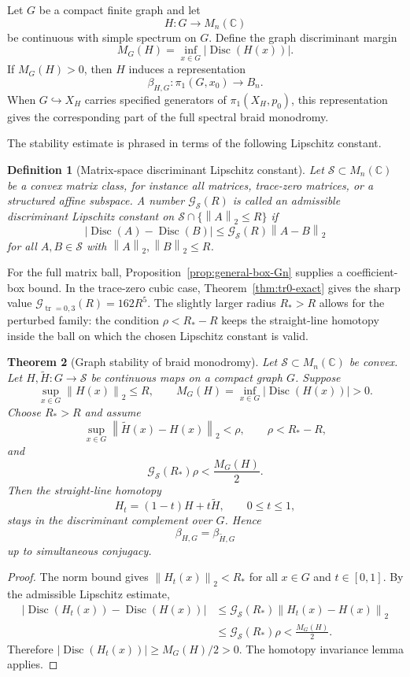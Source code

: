 \documentclass[11pt]{article}
\newtheorem{theorem}{Theorem}[section]
\newtheorem{definition}[theorem]{Definition}
\numberwithin{equation}{section}
\DeclareMathOperator{\Disc}{Disc}
\DeclareMathOperator{\tr}{tr}
\newcommand{\bbC}{\mathbb C}
\newcommand{\cG}{\mathcal G}
\newcommand{\cS}{\mathcal S}
\newcommand{\norm}[1]{\left\|#1\right\|}
\newcommand{\abs}[1]{\left|#1\right|}
\newcommand{\wt}[1]{\widetilde{#1}}
\begin{document}
Let $G$ be a compact finite graph and let
\[
  H:G\longrightarrow M_n(\bbC)
\]
be continuous with simple spectrum on $G$.  Define the graph discriminant
margin
\[
  M_G(H)=\inf_{x\in G}\abs{\Disc(H(x))}.
\]
If $M_G(H)>0$, then $H$ induces a representation
\[
  \beta_{H,G}:\pi_1(G,x_0)\longrightarrow B_n.
\]
When $G\hookrightarrow X_H$ carries specified generators of
$\pi_1(X_H,p_0)$, this representation gives the corresponding part of the
full spectral braid monodromy.

The stability estimate is phrased in terms of the following Lipschitz
constant.

\begin{definition}[Matrix-space discriminant Lipschitz constant]
Let $\cS\subset M_n(\bbC)$ be a convex matrix class, for instance all
matrices, trace-zero matrices, or a structured affine subspace.  A number
$\cG_{\cS}(R)$ is called an admissible discriminant Lipschitz constant on
$\cS\cap\{\norm{A}_2\le R\}$ if
\[
  \abs{\Disc(A)-\Disc(B)}
  \le \cG_{\cS}(R)\norm{A-B}_2
\]
for all $A,B\in\cS$ with $\norm{A}_2,\norm{B}_2\le R$.
\end{definition}

For the full matrix ball, Proposition~\ref{prop:general-box-Gn} supplies a
coefficient-box bound.  In the trace-zero cubic case,
Theorem~\ref{thm:tr0-exact} gives the sharp value
$\cG_{\tr=0,3}(R)=162R^5$.  The slightly larger radius $R_*>R$ allows for the
perturbed family: the condition $\rho<R_*-R$ keeps the straight-line homotopy
inside the ball on which the chosen Lipschitz constant is valid.

\begin{theorem}[Graph stability of braid monodromy]\label{thm:graph-stab}
Let $\cS\subset M_n(\bbC)$ be convex.  Let
$H,\wt H:G\to\cS$ be continuous maps on a compact graph $G$.  Suppose
\[
  \sup_{x\in G}\norm{H(x)}_2\le R,
  \qquad
  M_G(H)=\inf_{x\in G}\abs{\Disc(H(x))}>0.
\]
Choose $R_*>R$ and assume
\[
  \sup_{x\in G}\norm{\wt H(x)-H(x)}_2<\rho,
  \qquad
  \rho<R_*-R,
\]
and
\[
  \cG_{\cS}(R_*)\rho<\frac{M_G(H)}{2}.
\]
Then the straight-line homotopy
\[
  H_t=(1-t)H+t\wt H,
  \qquad 0\le t\le1,
\]
stays in the discriminant complement over $G$.  Hence
\[
  \beta_{H,G}=\beta_{\wt H,G}
\]
up to simultaneous conjugacy.
\end{theorem}

\begin{proof}
The norm bound gives $\norm{H_t(x)}_2<R_*$ for all $x\in G$ and
$t\in[0,1]$.  By the admissible Lipschitz estimate,
\begin{align*}
  \abs{\Disc(H_t(x))-\Disc(H(x))}
  &\le \cG_{\cS}(R_*)\norm{H_t(x)-H(x)}_2 \\
  &\le \cG_{\cS}(R_*)\rho
  <\frac{M_G(H)}{2}.
\end{align*}
Therefore $\abs{\Disc(H_t(x))}\ge M_G(H)/2>0$.  The homotopy invariance
lemma applies.
\end{proof}
\end{document}
